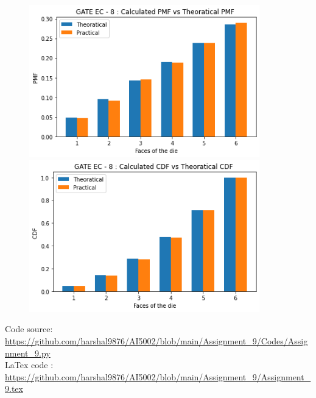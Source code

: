 \documentclass[journal,12pt,twocolumn]{IEEEtran}
\begin{document}
\begin{figure}[htp]
    \centering
    \includegraphics[width=10cm]{Assignment_9_1.png}
    \includegraphics[width=10cm]{Assignment_9_2.png}
    \label{fig :plot}
\end{figure}
\smallskip
\begin{tcolorbox}
Code source: \url{https://github.com/harshal9876/AI5002/blob/main/Assignment_9/Codes/Assignment_9.py} \\
LaTex code :
\url{https://github.com/harshal9876/AI5002/blob/main/Assignment_9/Assignment_9.tex}
\end{tcolorbox}
\vfill
\end{document}
